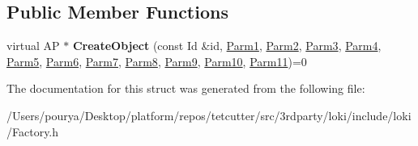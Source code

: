 \subsection*{Public Member Functions}
\begin{DoxyCompactItemize}
\item 
\hypertarget{structLoki_1_1FactoryImpl_3_01AP_00_01Id_00_01Seq_3_01P1_00_01P2_00_01P3_00_01P4_00_01P5_00_01P6938401cd8a7393dd2aec76a5416e9a38_acad859d3c172b5bbf61913d2fd67af8d}{}virtual A\+P $\ast$ {\bfseries Create\+Object} (const Id \&id, \hyperlink{classLoki_1_1EmptyType}{Parm1}, \hyperlink{classLoki_1_1EmptyType}{Parm2}, \hyperlink{classLoki_1_1EmptyType}{Parm3}, \hyperlink{classLoki_1_1EmptyType}{Parm4}, \hyperlink{classLoki_1_1EmptyType}{Parm5}, \hyperlink{classLoki_1_1EmptyType}{Parm6}, \hyperlink{classLoki_1_1EmptyType}{Parm7}, \hyperlink{classLoki_1_1EmptyType}{Parm8}, \hyperlink{classLoki_1_1EmptyType}{Parm9}, \hyperlink{classLoki_1_1EmptyType}{Parm10}, \hyperlink{classLoki_1_1EmptyType}{Parm11})=0\label{structLoki_1_1FactoryImpl_3_01AP_00_01Id_00_01Seq_3_01P1_00_01P2_00_01P3_00_01P4_00_01P5_00_01P6938401cd8a7393dd2aec76a5416e9a38_acad859d3c172b5bbf61913d2fd67af8d}

\end{DoxyCompactItemize}


The documentation for this struct was generated from the following file\+:\begin{DoxyCompactItemize}
\item 
/\+Users/pourya/\+Desktop/platform/repos/tetcutter/src/3rdparty/loki/include/loki/Factory.\+h\end{DoxyCompactItemize}

